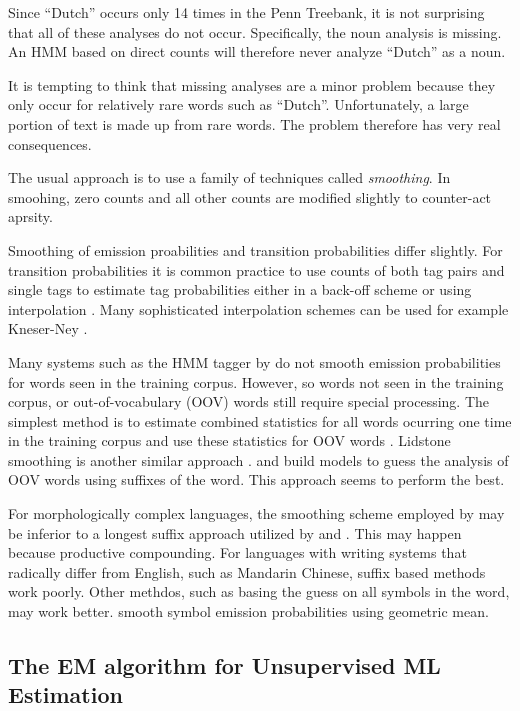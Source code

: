 Since ``Dutch'' occurs only 14 times in the Penn Treebank, it is not
surprising that all of these analyses do not occur. Specifically, the
noun analysis is missing. An HMM based on direct counts will therefore
never analyze ``Dutch'' as a noun.

It is tempting to think that missing analyses are a minor problem
because they only occur for relatively rare words such as
``Dutch''. Unfortunately, a large portion of text is made up from rare
words. The problem therefore has very real consequences.

The usual approach is to use a family of techniques called {\it
  smoothing}. In smoohing, zero counts and all other counts are
modified slightly to counter-act aprsity.

Smoothing of emission proabilities and transition probabilities differ
slightly. For transition probabilities it is common practice to use
counts of both tag pairs and single tags to estimate tag probabilities
either in a back-off scheme \citep{foo} or using interpolation
\citep{Brants2000}. Many sophisticated interpolation schemes can be
used for example Kneser-Ney \citep{foo}.

Many systems such as the HMM tagger by \cite{Brants2000} do not smooth
emission probabilities for words seen in the training corpus. However,
so words not seen in the training corpus, or out-of-vocabulary (OOV)
words still require special processing. The simplest method is to
estimate combined statistics for all words ocurring one time in the
training corpus and use these statistics for OOV words
\citep{foo}. Lidstone smoothing is another similar approach
\citep{foo}. \cite{Brants2000} and \cite{SamuelssonXX} build models to
guess the analysis of OOV words using suffixes of the word. This
approach seems to perform the best. 

For morphologically complex languages, the smoothing scheme employed
by \cite{Brants2000} may be inferior to a longest suffix approach
utilized by \cite{Silfverberg2011} and \cite{Linden2009}. This may
happen because productive compounding. For languages with writing
systems that radically differ from English, such as Mandarin Chinese,
suffix based methods work poorly. Other methdos, such as basing the
guess on all symbols in the word, may work better. \cite{Huang2007}
smooth symbol emission probabilities using geometric mean.
 
\subsection{The EM algorithm for Unsupervised ML Estimation}

